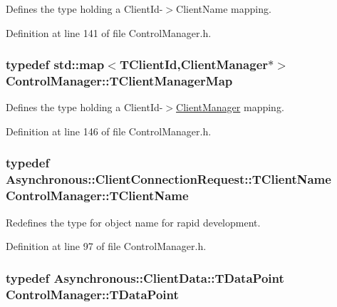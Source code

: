 Defines the type holding a Client\-Id-\/$>$Client\-Name mapping. 



Definition at line 141 of file Control\-Manager.\-h.

\hypertarget{class_control_manager_a27b18022695359e2a4d5563f91b6befd}{
\subsubsection[{T\-Client\-Manager\-Map}]{\setlength{\rightskip}{0pt plus 5cm}typedef std\-::map$<${\bf T\-Client\-Id},{\bf Client\-Manager}$\ast$$>$ {\bf Control\-Manager\-::\-T\-Client\-Manager\-Map}\hspace{0.3cm}{\ttfamily [private]}}}\label{class_control_manager_a27b18022695359e2a4d5563f91b6befd}


Defines the type holding a Client\-Id-\/$>$\hyperlink{class_client_manager}{Client\-Manager} mapping. 



Definition at line 146 of file Control\-Manager.\-h.

\hypertarget{class_control_manager_ae9c86c5286c9ebf222ea44b60c463872}{
\subsubsection[{T\-Client\-Name}]{\setlength{\rightskip}{0pt plus 5cm}typedef {\bf Asynchronous\-::\-Client\-Connection\-Request\-::\-T\-Client\-Name} {\bf Control\-Manager\-::\-T\-Client\-Name}}}\label{class_control_manager_ae9c86c5286c9ebf222ea44b60c463872}


Redefines the type for object name for rapid development. 



Definition at line 97 of file Control\-Manager.\-h.

\hypertarget{class_control_manager_a236ef5279ad4f3082443e4c6d300a7d2}{
\subsubsection[{T\-Data\-Point}]{\setlength{\rightskip}{0pt plus 5cm}typedef {\bf Asynchronous\-::\-Client\-Data\-::\-T\-Data\-Point} {\bf Control\-Manager\-::\-T\-Data\-Point}}}\label{class_control_manager_a236ef5279ad4f3082443e4c6d300a7d2}



